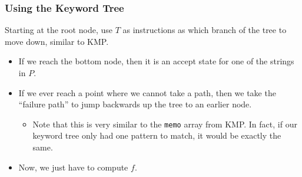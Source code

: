 \documentclass[10pt]{article}
\begin{document}
\subsubsection*{Using the Keyword Tree}
Starting at the root node, use $T$ as instructions as which branch of the tree to move down, similar to KMP.
\begin{itemize}
	\item If we reach the bottom node, then it is an accept state for one of the strings in $P$.
	\item If we ever reach a point where we cannot take a path, then we take the ``failure path'' to jump backwards up the tree to an earlier node.
	\begin{itemize}
	    \item Note that this is very similar to the \texttt{memo} array from KMP. In fact, if our keyword tree only had one pattern to match, it would be exactly the same.
    \end{itemize}
	\item Now, we just have to compute $f$.
\end{itemize}
\end{document}
